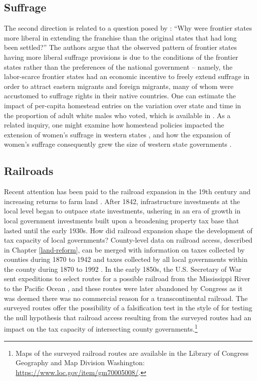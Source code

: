 \subsection{Suffrage} The second direction is related to a question posed by \citet{engerman2005evolution}: ``Why were frontier states more liberal in extending the franchise than the original states that had long been settled?'' The authors argue that the observed pattern of frontier states having more liberal suffrage provisions is due to the conditions of the frontier states rather than the preferences of the national government -- namely, the labor-scarce frontier states had an economic incentive to freely extend suffrage in order to attract eastern migrants and foreign migrants, many of whom were accustomed to suffrage rights in their native countries. One can estimate the impact of per-capita homestead entries on the variation over state and time in the proportion of adult white males who voted, which is available in \citet{mccormick1960new}. As a related inquiry, one might examine how homestead policies impacted the extension of women's suffrage in western states \citep{teele2018west}, and how the expansion of women's suffrage consequently grew the size of western state governments \citep{lott1999did}.

\subsection{Railroads} Recent attention has been paid to the railroad expansion in the 19th century and increasing returns to farm land  \citep{donaldson2016railroads}. After 1842, infrastructure investments at the local level began to outpace state investments, ushering in an era of growth in local government investments built upon a broadening property tax base that lasted until the early 1930s. How did railroad expansion shape the development of tax capacity of local governments? County-level data on railroad access, described in Chapter \ref{land-reform}, can be merged with information on taxes collected by counties during 1870 to 1942 and taxes collected by all local governments within the county during 1870 to 1992 \citep{rhode2003assessing}. In the early 1850s, the U.S. Secretary of War sent expeditions to select routes for a possible railroad from the Mississippi River to the Pacific Ocean \citep{blake1857geological,baird1858reports}, and these routes were later abandoned by Congress as it was deemed there was no commercial reason for a transcontinental railroad. The surveyed routes offer the possibility of a falsification test in the style of \citep{donaldson2018railroads} for testing the null hypothesis that railroad access resulting from the surveyed routes had an impact on the tax capacity of intersecting county governments.\footnote{Maps of the surveyed railroad routes are available in the Library of Congress Geography and Map Division Washington: \url{https://www.loc.gov/item/gm70005008/}.}

